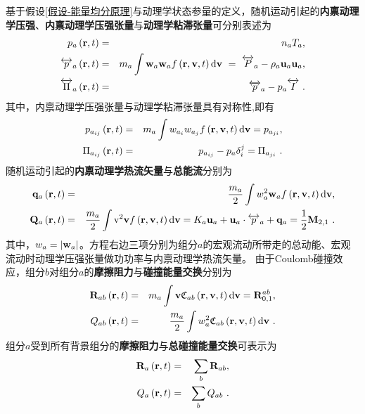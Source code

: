   基于假设\ref{假设-能量均分原理}与动理学状态参量的定义，随机运动引起的\textbf{内禀动理学压强}、\textbf{内禀动理学压强张量}与\textbf{动理学粘滞张量}可分别表述为
  \begin{eqnarray}
      p_a \left(\mathbf{r},t \right) &=& n_a T_a, \label{pa}\\
      \overleftrightarrow{p}_a \left(\mathbf{r},t \right) &=& m_a \int \mathbf{w}_a \mathbf{w}_a f \left(\mathbf{r},\mathbf{v},t \right) \mathrm{d} \mathbf{v} \ = \ \overleftrightarrow{P}_a - \rho_a \mathbf{u}_a \mathbf{u}_a  , \label{paI} \\
      {\overleftrightarrow{\Pi}}_a \left(\mathbf{r},t \right) &=& \overleftrightarrow{p}_a - p_a \overleftrightarrow{I}
      ~. \label{PiaI} 
  \end{eqnarray}
  其中，内禀动理学压强张量与动理学粘滞张量具有对称性,即有
  \begin{eqnarray}
      p_{a_{ij}} \left(\mathbf{r},t \right) &=& m_a \int w_{a_i} w_{a_j} f \left(\mathbf{r},\mathbf{v},t \right) \mathrm{d} \mathbf{v} = p_{a_{ji}}, \label{paij} \\
      \Pi_{a_{ij}} \left(\mathbf{r},t \right) &=& p_{a_{ij}} - p_a \delta_i^j = \Pi_{a_{ji}}
      ~. \label{Piaij}
  \end{eqnarray}
  随机运动引起的\textbf{内禀动理学热流矢量}与\textbf{总能流}分别为
  \begin{eqnarray}
      \mathbf{q}_a \left(\mathbf{r},t \right) &=& \frac{m_a}{2} \int w_a^2 \mathbf{w}_a  f \left(\mathbf{r},\mathbf{v},t \right) \mathrm{d} \mathbf{v}, \label{bfqa}\\
      \mathbf{Q}_a \left(\mathbf{r},t \right) &=&  \frac{m_a}{2} \int \mathrm{v}^2 \mathbf{v} f \left(\mathbf{r},\mathbf{v},t \right) \mathrm{d} \mathbf{v} = K_a  \mathbf{u}_a +  \mathbf{u}_a \cdot  \overleftrightarrow{p}_a  +  \mathbf{q}_a = \frac{1}{2}  \mathbf{M}_{2,1}
      ~. \label{bfQa}
  \end{eqnarray}
  其中，$w_a=|\mathbf{w}_a|$。方程右边三项分别为组分$a$的宏观流动所带走的总动能、宏观流动时动理学压强张量做功功率与内禀动理学热流矢量。
  由于Coulomb碰撞效应，组分$b$对组分$a$的\textbf{摩擦阻力}与\textbf{碰撞能量交换}分别为
  \begin{eqnarray}
      \mathbf{R}_{ab} \left(\mathbf{r},t \right) &=& m_a \int \mathbf{v}  \mathfrak{C}_{ab} \left(\mathbf{r},\mathbf{v},t \right) \mathrm{d} \mathbf{v} = \mathbf{R}^{ab}_{0,1}, \label{Rab} \\
      Q_{ab} \left(\mathbf{r},t \right) &=& \frac{m_a}{2} \int w_a^2  \mathfrak{C}_{ab} \left(\mathbf{r},\mathbf{v},t \right) \mathrm{d} \mathbf{v} 
      ~. \label{Qab}
  \end{eqnarray}
  组分$a$受到所有背景组分的\textbf{摩擦阻力}与\textbf{总碰撞能量交换}可表示为
  \begin{eqnarray}
      \mathbf{R}_{a} \left(\mathbf{r},t \right) &=& \sum_b \mathbf{R}_{ab}, \label{Ra} \\
      Q_{a} \left(\mathbf{r},t \right) &=& \sum_b Q_{ab}
      ~. \label{Qa}
  \end{eqnarray}
  
